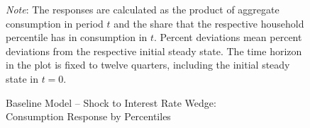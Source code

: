 \documentclass[a4paper,12pt]{article} %
\numberwithin{equation}{section} %
\numberwithin{figure}{section}
\numberwithin{table}{section}
\begin{document}
\begin{refsection}
\begin{appendices}
\begin{figure}[H]
    \centering
    \caption{Baseline Model -- Shock to Interest Rate Wedge: \\ Consumption Response by Percentiles}
    \label{fig:baseline-permanent-wedge-dist-c-response}
    
    
    \vspace{10pt}
    
    \begin{minipage}{0.75\textwidth} 
    \footnotesize
    \textit{Note}: The responses are calculated as the product of aggregate consumption in period $t$ and the share that the respective household percentile has in consumption in $t$. Percent deviations mean percent deviations from the respective initial steady state. The time horizon in the plot is fixed to twelve quarters, including the initial steady state in $t=0$.
    \end{minipage}
\end{figure}


\end{appendices}
\end{refsection}
\end{document}
